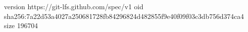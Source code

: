version https://git-lfs.github.com/spec/v1
oid sha256:7a22d53a4027a250681728fb84296824d482855f9e40f09f03c3db756d374ca4
size 196704
